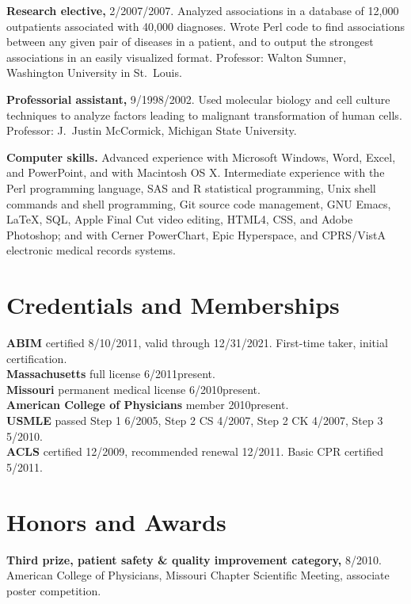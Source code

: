 \documentclass[12pt]{article}
\begin{document}
\textbf{Research elective,} 2/2007/2007. Analyzed associations
in a database of 12,000 outpatients associated with 40,000 diagnoses.
Wrote Perl code to find associations between any given pair of
diseases in a patient, and to output the strongest associations in an
easily visualized format. Professor: Walton Sumner, Washington
University in St.\ Louis.

\textbf{Professorial assistant,} 9/1998/2002. Used molecular
biology and cell culture techniques to analyze factors leading to
malignant transformation of human cells. Professor: J.\ Justin
McCormick, Michigan State University.

\textbf{Computer skills.} Advanced experience with Microsoft Windows, Word,
Excel, and PowerPoint, and with Macintosh OS X. Intermediate
experience with the Perl programming language, SAS and R statistical
programming, Unix shell commands and shell programming, Git source
code management, GNU Emacs, \LaTeX, SQL, Apple Final Cut video editing,
HTML4, CSS, and Adobe Photoshop; and with Cerner PowerChart, Epic
Hyperspace, and CPRS/VistA electronic medical records systems.

\section*{Credentials and Memberships}

\textbf{ABIM} certified 8/10/2011, valid through 12/31/2021. First-time taker,
initial certification.\\
\textbf{Massachusetts} full license 6/2011\ndash{}present.\\
\textbf{Missouri} permanent medical license 6/2010\ndash{}present.\\
\textbf{American College of Physicians} member 2010\ndash{}present.\\
\textbf{USMLE} passed Step 1 6/2005, Step 2 CS 4/2007, Step 2 CK 4/2007, Step 3
5/2010.\\
\textbf{ACLS} certified 12/2009, recommended renewal 12/2011. Basic CPR
certified 5/2011.

\section*{Honors and Awards}

\textbf{Third prize, patient safety \& quality improvement category,} 8/2010.
American College of Physicians, Missouri Chapter Scientific Meeting,
associate poster competition.
\end{document}
